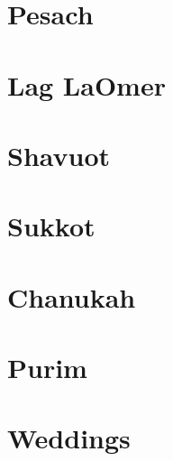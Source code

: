 \documentclass[letterpaper]{memoir}
\newcommand{\song}[2]{}
\begin{document}
\chapter{Pesach}
\song{Yachid Norah}{Yachid_Norah.pdf}
\song{Rachum Atah}{Rachum_Atah.pdf}
\song{B'neh Li Zevul Mishkani}{B'neh_Li_Zevul_Mishkani.pdf}
\song{Emunim Irchu Shevach (Yerushalmi)}{Emunim_Irchu_Shevach_Yerushalyim.pdf}
\song{Emunim Irchu Shevach (Syrian)}{Emunim_Irchu_Shevach_Syrian.pdf}
\song{Mi Yimalel Gevurotecha}{Mi_Yimalel_Gevurotecha.pdf}

\chapter{Lag LaOmer}
\song{V'amartem Ko Lachai}{V'amartem_Ko_Lachai.pdf}

\chapter{Shavuot}
\song{Roe' Ne'eman Hu}{Roe'_Ne'eman_Hu.pdf}
\song{T'nu Kavod LaTorah}{T'nu_Kavod_LaTorah.pdf}

\chapter{Sukkot}
\song{Sukkah v'Lulav (Moroccan)}{Sukkah_v'Lulav_Moroccan.pdf}
\song{Sukkah v'Lulav (Yerushalmi)}{Sukkah_v'Lulav_Yerushalmi.pdf}
\song{Chanun Rachem}{Chanun_Rachem.pdf}
\song{Yah Et Sukkat David Takim}{Yah_Et_Sukkat_David_Takim.pdf}

\chapter{Chanukah}
\song{Yah Hatzel Yonah}{Yah_Hatzel_Yonah.pdf}
\song{Heichalo Heichalo}{Heichalo_Heichalo.pdf}
\song{L'neri}{L'neri.pdf}

\chapter{Purim}
\song{Ronu Gilu}{Ronu_Gilu.pdf}
\song{Or Gilah}{Or_Gilah.pdf} %
\song{El Melech Ne'eman}{El_Melech_Ne'eman.pdf}

\chapter{Weddings}
\song{Yismach Hatani}{Yismach_Hatani.pdf}
\song{El Me'od Na'alah}{El_Me'od_Na'alah.pdf}
\song{Semach Nafshi}{Semach_Nafshi.pdf} %
\song{Makhelot Am}{Makhelot_Am.pdf}
\song{Ya'alah Ya'alah (Yerushalmi)}{Ya'alah_Ya'alah_Yerushalmi.pdf}
\song{Ya'alah Ya'alah (Syrian)}{Ya'alah_Ya'alah_Syrian.pdf}
\song{Et Dodim Kalah}{Et_Dodim_Kalah.pdf}
\end{document}
